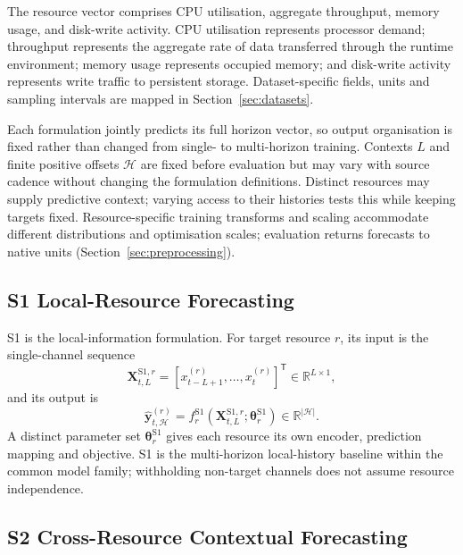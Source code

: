 \documentclass[a4paper,fleqn]{cas-dc}
\begin{document}
The resource vector comprises CPU utilisation, aggregate throughput, memory
usage, and disk-write activity. CPU utilisation represents processor demand;
throughput represents the aggregate rate of data transferred through the
runtime environment; memory usage represents occupied memory; and disk-write
activity represents write traffic to persistent storage. Dataset-specific
fields, units and sampling intervals are mapped in Section~\ref{sec:datasets}.

Each formulation jointly predicts its full horizon vector, so output
organisation is fixed rather than changed from single- to multi-horizon
training. Contexts $L$ and finite positive offsets $\mathcal{H}$ are fixed
before evaluation but may vary with source cadence without changing the
formulation definitions. Distinct resources may supply predictive context;
varying access to their histories tests this while keeping targets fixed.
Resource-specific training transforms and scaling accommodate different
distributions and optimisation scales; evaluation returns forecasts to native
units (Section~\ref{sec:preprocessing}).

\subsection{S1 Local-Resource Forecasting}
\label{sec:s1}

S1 is the local-information formulation. For target resource $r$, its input is
the single-channel sequence
\begin{equation}
  \mathbf{X}_{t,L}^{\mathrm{S1},r}
  = [x_{t-L+1}^{(r)},\ldots,x_t^{(r)}]^{\mathsf T}
  \in\mathbb{R}^{L\times 1},
  \label{eq:s1-input}
\end{equation}
and its output is
\begin{equation}
  \widehat{\mathbf{y}}_{t,\mathcal{H}}^{(r)}
  = f_r^{\mathrm{S1}}
    (\mathbf{X}_{t,L}^{\mathrm{S1},r};\boldsymbol{\theta}_r^{\mathrm{S1}})
  \in\mathbb{R}^{|\mathcal{H}|}.
  \label{eq:s1-forecast}
\end{equation}
A distinct parameter set $\boldsymbol{\theta}_r^{\mathrm{S1}}$ gives each
resource its own encoder, prediction mapping and objective. S1 is the
multi-horizon local-history baseline within the common model family;
withholding non-target channels does not assume resource independence.

\subsection{S2 Cross-Resource Contextual Forecasting}
\label{sec:s2}
\end{document}
